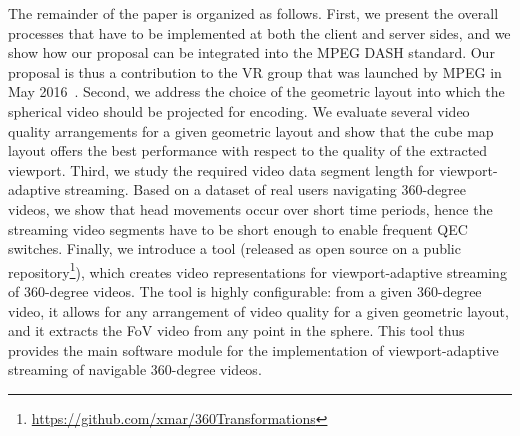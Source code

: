 The remainder of the paper is organized as follows. First, we present the overall processes that have to
be implemented at both the client and server sides, and we show how our proposal can be integrated
into the MPEG \ac{DASH} standard. Our proposal is thus a contribution to the
\ac{VR} group that was launched by MPEG in May 2016~\cite{mpeg-vr}.
Second, we address the choice of the geometric layout into which the spherical video should
be projected for encoding. We evaluate
several video quality arrangements for a given geometric layout and show that the
cube map layout offers the best performance with respect to the quality of the extracted
viewport.
Third, we study the required video data segment length
for viewport-adaptive streaming. Based on a dataset of
real users navigating 360-degree videos, we show that head movements occur over short time periods, hence the streaming video segments have to be short enough to enable
frequent \ac{QEC} switches.
Finally, we introduce a tool (released as open source on a public
repository\footnote{\url{https://github.com/xmar/360Transformations}}),
which creates video representations for
viewport-adaptive streaming of 360-degree videos.
The tool is highly configurable: from a given 360-degree video, it allows for
any arrangement of video quality for a given geometric layout, and it
extracts the
\ac{FoV} video from any point in the sphere. This tool thus provides the
main software module for the implementation of viewport-adaptive streaming
of navigable 360-degree videos.


%
%
%
%


